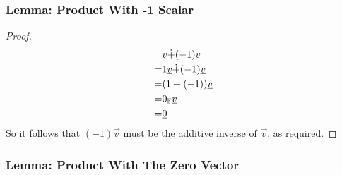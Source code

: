 \documentclass{exam}
\begin{document}
\subsubsection{Lemma: Product With -1 Scalar}


\begin{proof}
\begin{align*}
    &\underline{v} \dot{+} (-1)\underline{v} \\
    =& 1\underline{v} \dot{+} (-1)\underline{v} \\
    =& (1 + (-1))\underline{v}  \\
    =& 0_{\mathbb{F}} \underline{v}  \\
    =& \underline{0} \\
\end{align*}
So it follows that $(-1)\vec{v}$ must be the additive inverse of $\vec{v}$, as required.
\end{proof}

\subsubsection{Lemma: Product With The Zero Vector}\label{l124}

\end{document}

